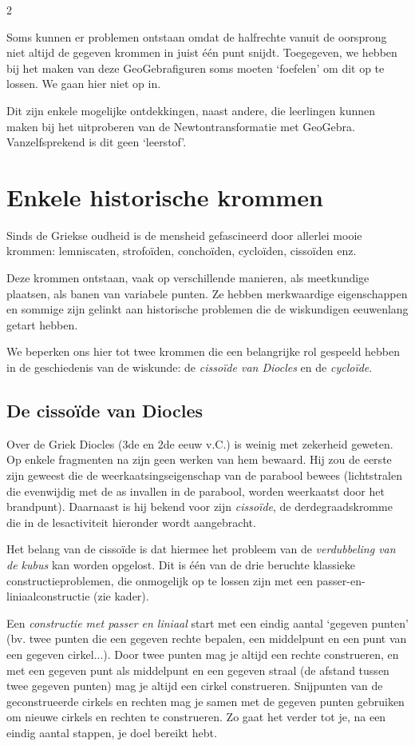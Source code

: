 \begin{multicols}{2}

Soms kunnen er problemen ontstaan omdat de halfrechte vanuit de oorsprong niet altijd de gegeven krommen in juist één punt snijdt. Toegegeven, we hebben bij het maken van deze GeoGebrafiguren soms moeten `foefelen' om dit op te lossen. We gaan hier niet op in.

Dit zijn enkele mogelijke ontdekkingen, naast andere, die leerlingen kunnen maken bij het uitproberen van de Newtontransformatie met GeoGebra. Vanzelfsprekend is dit geen `leerstof'. 


\section{Enkele historische krommen}

Sinds de Griekse oudheid is de mensheid gefascineerd door allerlei mooie krommen: lemniscaten, strofoïden, conchoïden, cycloïden, cissoïden enz. 

Deze krommen ontstaan, vaak op verschillende manieren, als meetkundige plaatsen, als banen van variabele punten. Ze hebben merkwaardige eigenschappen en sommige zijn gelinkt aan historische problemen die de wiskundigen eeuwenlang getart hebben.

We beperken ons hier tot twee krommen die een belangrijke rol gespeeld hebben in de geschiedenis van de wiskunde: de \emph{cissoïde van Diocles} en de \emph{cycloïde}.

\subsection{De cissoïde van Diocles}

Over de Griek Diocles (3de en 2de eeuw v.C.) is weinig met zekerheid geweten. Op enkele fragmenten na zijn geen werken van hem bewaard. Hij zou de eerste zijn geweest die de weerkaatsingseigenschap van de parabool bewees (lichtstralen die evenwijdig met de as invallen in de parabool, worden weerkaatst door het brandpunt). Daarnaast is hij bekend voor zijn \emph{cissoïde}, de derdegraadskromme die in de lesactiviteit hieronder wordt aangebracht. 

Het belang van de cissoïde is dat hiermee het probleem van de \emph{verdubbeling van de kubus} kan worden opgelost. Dit is één van de drie beruchte klassieke constructieproblemen, die onmogelijk op te lossen zijn met een passer-en-liniaalconstructie (zie kader). 

Een \emph{constructie met passer en liniaal} start met een eindig aantal `gegeven punten' (bv. twee punten die een gegeven rechte bepalen, een middelpunt en een punt van een gegeven cirkel...). Door twee punten mag je altijd een rechte construeren, en met een gegeven punt als middelpunt en een gegeven straal (de afstand tussen twee gegeven punten) mag je altijd een cirkel construeren. Snijpunten van de geconstrueerde cirkels en rechten mag je samen met de gegeven punten gebruiken om nieuwe cirkels en rechten te construeren. Zo gaat het verder tot je, na een eindig aantal stappen, je doel bereikt hebt.


\end{multicols}
